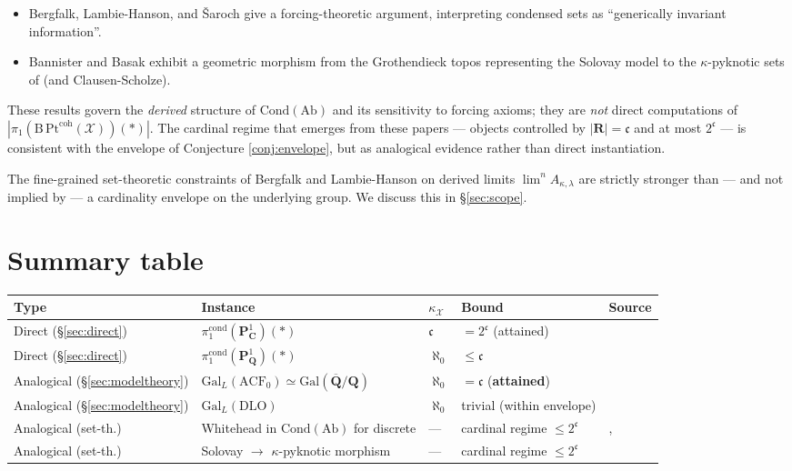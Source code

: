\documentclass[11pt]{article}
\theoremstyle{definition}
\theoremstyle{plain}
\theoremstyle{remark}
\newcommand{\Cond}{\mathrm{Cond}}
\newcommand{\Pt}{\mathrm{Pt}}
\newcommand{\Bcat}{\mathrm{B}}
\newcommand{\GalL}{\mathrm{Gal}_{L}}
\newcommand{\Galabs}{\mathrm{Gal}}
\newcommand{\Pone}{\mathbf{P}^{1}}
\newcommand{\C}{\mathbf{C}}
\newcommand{\Q}{\mathbf{Q}}
\newcommand{\R}{\mathbf{R}}
\newcommand{\continuum}{\mathfrak{c}}
\begin{document}
\begin{itemize}
\item Bergfalk, Lambie-Hanson, and \v Saroch \cite{BLHS2023} give a
forcing-theoretic argument, interpreting condensed sets as ``generically
invariant information''.
\item Bannister and Basak \cite{BannisterBasak2026} exhibit a geometric
morphism from the Grothendieck topos representing the Solovay model to the
$\kappa$-pyknotic sets of \cite{BarwickGlasmanHaine2018} (and Clausen-Scholze).
\end{itemize}

These results govern the \emph{derived} structure of $\Cond(\mathrm{Ab})$ and
its sensitivity to forcing axioms; they are \emph{not} direct computations of
$|\pi_1(\Bcat\,\Pt^{\mathrm{coh}}(\mathcal X))(\ast)|$. The cardinal regime
that emerges from these papers --- objects controlled by $|\R| = \continuum$
and at most $2^{\continuum}$ --- is consistent with the envelope of
Conjecture \ref{conj:envelope}, but as analogical evidence rather than direct
instantiation.

The fine-grained set-theoretic constraints of Bergfalk and Lambie-Hanson
\cite{BergfalkLH2024} on derived limits $\lim^n A_{\kappa,\lambda}$ are
strictly stronger than --- and not implied by --- a cardinality envelope on
the underlying group. We discuss this in \S\ref{sec:scope}.

\section{Summary table}

\begin{center}
\begin{longtable}{@{}p{2.4cm} p{4.6cm} p{2.0cm} p{3.4cm} p{2.0cm}@{}}
\toprule
\textbf{Type} & \textbf{Instance} & \textbf{$\kappa_{\mathcal X}$} & \textbf{Bound} & \textbf{Source} \\
\midrule
Direct (\S\ref{sec:direct}) & $\pi_1^{\mathrm{cond}}(\Pone_{\C})(\ast)$ & $\continuum$ & $= 2^{\continuum}$ (attained) & \cite[Rmk 7.14]{HHLMMW2025} \\
Direct (\S\ref{sec:direct}) & $\pi_1^{\mathrm{cond}}(\Pone_{\Q})(\ast)$ & $\aleph_0$ & $\le \continuum$ & \cite[Rmk 7.14]{HHLMMW2025} \\
\addlinespace
Analogical (\S\ref{sec:modeltheory}) & $\GalL(\mathrm{ACF}_0) \simeq \Galabs(\overline{\Q}/\Q)$ & $\aleph_0$ & $= \continuum$ (\textbf{attained}) & \cite[Ex.~4.8]{CampionCousinsYe2021} \\
Analogical (\S\ref{sec:modeltheory}) & $\GalL(\mathrm{DLO})$ & $\aleph_0$ & trivial (within envelope) & \cite[Ex.~4.4]{CampionCousinsYe2021} \\
\addlinespace
Analogical (set-th.) & Whitehead in $\Cond(\mathrm{Ab})$ for discrete & --- & cardinal regime $\le 2^{\continuum}$ & \cite{ClausenScholze2019Lectures}, \cite{BLHS2023} \\
Analogical (set-th.) & Solovay $\to$ $\kappa$-pyknotic morphism & --- & cardinal regime $\le 2^{\continuum}$ & \cite{BannisterBasak2026} \\
\bottomrule
\end{longtable}
\end{center}
\end{document}
